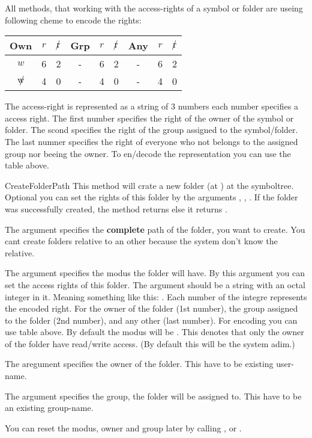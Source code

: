 All methods, that working with the access-rights of a symbol or folder
are useing following cheme to encode the rights:

\begin{center}
\begin{tabular}{|c|cc||c|cc||c|cc|} \hline\hline
\bf{Own} & $r$&$\not r$&\bf{Grp}&$r$ & $\not r$ & \bf{Any} & $r$ & $\not r$\\\hline
$w$ & 6 & 2 & - & 6 & 2 & - & 6 & 2 \\
$\not w$ & 4 & 0 & - & 4 & 0 & - & 4 & 0 \\\hline\hline
\end{tabular}
\end{center}
The access-right is represented as a string of 3 numbers each number specifies 
a access right. The first number specifies the right of the owner of the 
symbol or folder. The scond specifies the right of the group assigned to the 
symbol/folder.  The last numner specifies the right of everyone who not 
belongs to the assigned group nor beeing the owner. To en/decode the 
representation you can use the table above.


\begin{methoddesc}[System]{CreateFolder}{Path}
This method will crate a new folder (at ) at the symboltree. 
Optional you can set the rights of this folder by the arguments , 
, . If the folder was successfully created, the method 
returns  else it returns .

The argument  specifies the \textbf{complete} path of the folder, 
you want to create. You cant create folders relative to an other because the 
system don't know the relative.

The argument  specifies the modus the folder will have. By this 
argument you can set the access rights of this folder. The argument should be
a string with an octal integer in it. Meaning something like this: .
Each number of the integre represents the encoded right. For the owner of the
folder (1st number), the group assigned to the folder (2nd number), and any other
(last number). For encoding you can use table above. 
By default the modus will be . This denotes that only the owner 
of the folder have read/write access. (By default this will be the system adim.)

The aregument  specifies the owner of the folder. This have to be 
existing user-name. 

The argument  specifies the group, the folder will be assigned to. 
This have to be an existing group-name.

\begin{notice}
You can reset the modus, owner and group later by calling 
,  or .
\end{notice}
\end{methoddesc}


